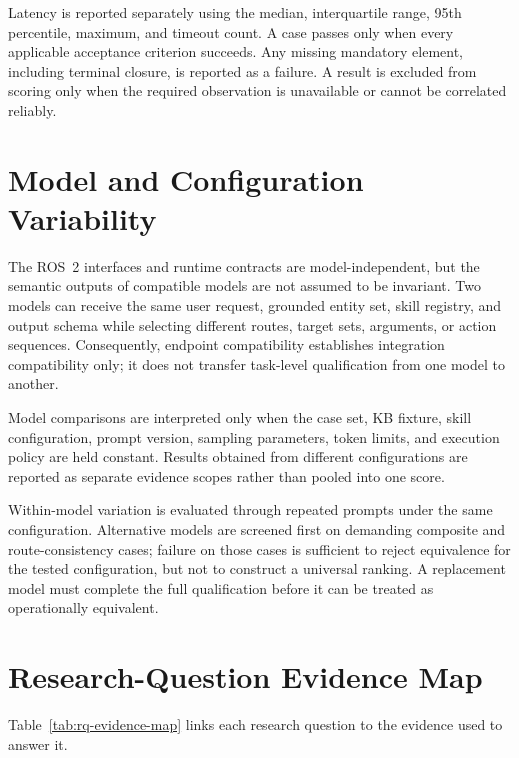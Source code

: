 Latency is reported separately using the median, interquartile range, 95th percentile, maximum, and timeout count. A case passes only when every applicable acceptance criterion succeeds. Any missing mandatory element, including terminal closure, is reported as a failure. A result is excluded from scoring only when the required observation is unavailable or cannot be correlated reliably.

\section{Model and Configuration Variability}

The ROS~2 interfaces and runtime contracts are model-independent, but the semantic outputs of compatible models are not assumed to be invariant. Two models can receive the same user request, grounded entity set, skill registry, and output schema while selecting different routes, target sets, arguments, or action sequences. Consequently, endpoint compatibility establishes integration compatibility only; it does not transfer task-level qualification from one model to another.

Model comparisons are interpreted only when the case set, KB fixture, skill configuration, prompt version, sampling parameters, token limits, and execution policy are held constant. Results obtained from different configurations are reported as separate evidence scopes rather than pooled into one score.

Within-model variation is evaluated through repeated prompts under the same configuration. Alternative models are screened first on demanding composite and route-consistency cases; failure on those cases is sufficient to reject equivalence for the tested configuration, but not to construct a universal ranking. A replacement model must complete the full qualification before it can be treated as operationally equivalent.

\section{Research-Question Evidence Map}

Table~\ref{tab:rq-evidence-map} links each research question to the evidence used to answer it.

